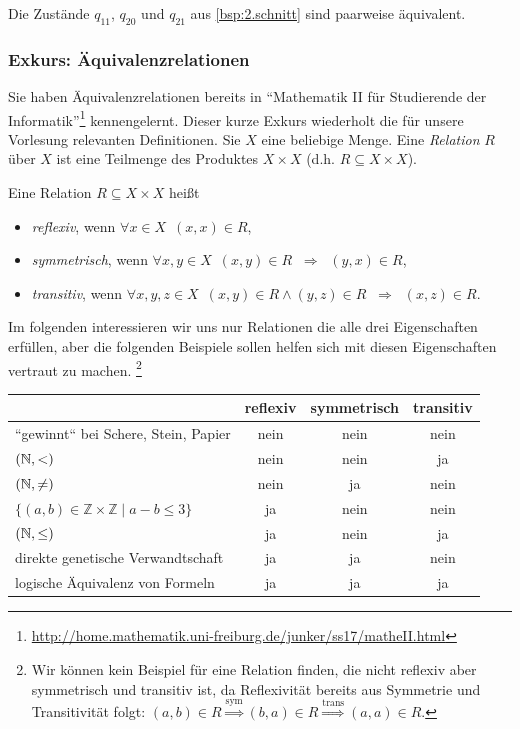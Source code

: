 Die Zustände $q_{11}$, $q_{20}$ und $q_{21}$ aus \autoref{bsp:2.schnitt} sind paarweise äquivalent.

\subsubsection{Exkurs: Äquivalenzrelationen}
Sie haben Äquivalenzrelationen bereits in ``Mathematik II für Studierende der Informatik''\footnote{\url{http://home.mathematik.uni-freiburg.de/junker/ss17/matheII.html}} kennengelernt.
Dieser kurze Exkurs wiederholt die für unsere Vorlesung relevanten Definitionen.
Sie $X$ eine beliebige Menge. Eine \emph{Relation} $R$ über $X$ ist eine Teilmenge des Produktes $X\times X$ (d.h. $R\subseteq X\times X$).

Eine Relation $R\subseteq X\times X$ heißt
\begin{itemize}
 \item \emph{reflexiv}, wenn $\forall x\in X$\ $(x,x)\in R$, 
 \item \emph{symmetrisch}, wenn $\forall x, y\in X$\ $(x,y)\in R \;\; \Rightarrow\;\; (y,x)\in R$, 
 \item \emph{transitiv}, wenn $\forall x, y, z\in X$\ $(x,y)\in R \land (y,z)\in R\;\; \Rightarrow\;\; (x,z)\in R$.
\end{itemize}

\begin{Bsp} Im folgenden interessieren wir uns nur Relationen die alle drei Eigenschaften erfüllen, 
aber die folgenden Beispiele sollen helfen sich mit diesen Eigenschaften vertraut zu machen.
\footnote{Wir können kein Beispiel für eine Relation finden, die nicht reflexiv aber symmetrisch und transitiv ist, da Reflexivität bereits aus Symmetrie und Transitivität folgt: 
$(a,b)\in R\stackrel{\text{sym}}{\Rightarrow} (b,a)\in R\stackrel{\text{trans}}{\Rightarrow} (a,a)\in R$.}

\begin{center}
\begin{tabular}{lccc}
& reflexiv & symmetrisch & transitiv\\ \hline
``gewinnt`` bei Schere, Stein, Papier & nein & nein & nein\\
$(\mathbb{N}, <)$ & nein & nein & ja\\
$(\mathbb{N}, \neq)$ & nein & ja & nein\\
$\{(a,b)\in\mathbb{Z}\times\mathbb{Z}\mid a-b\leq 3\}$ & ja & nein & nein\\
$(\mathbb{N}, \leq)$& ja & nein & ja\\
direkte genetische Verwandtschaft & ja & ja & nein\\
logische Äquivalenz von Formeln & ja & ja & ja\\
\end{tabular}
\end{center}
\end{Bsp}

